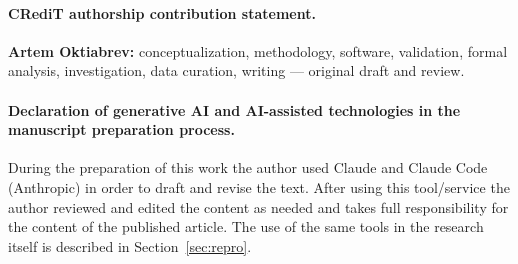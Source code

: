 \paragraph{CRediT authorship contribution statement.}
\textbf{Artem Oktiabrev:} conceptualization, methodology, software, validation, formal analysis,
investigation, data curation, writing --- original draft and review.

\paragraph{Declaration of generative AI and AI-assisted technologies in the manuscript preparation
process.}
During the preparation of this work the author used Claude and Claude Code (Anthropic) in order to draft
and revise the text. After using this tool/service the author reviewed and edited the content as needed
and takes full responsibility for the content of the published article. The use of the same tools in the
research itself is described in Section~\ref{sec:repro}.
